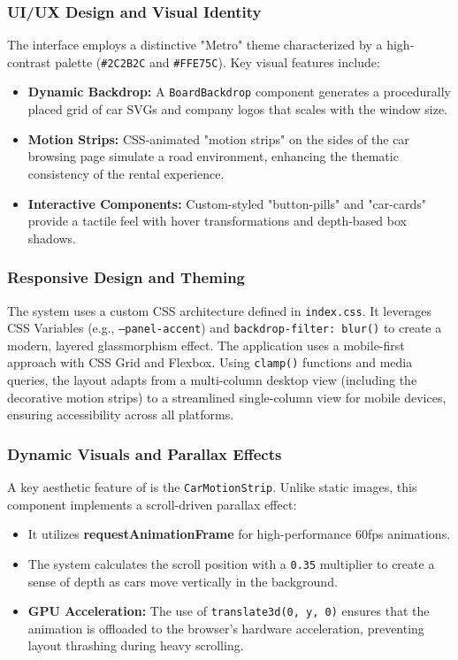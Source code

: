 \subsubsection{UI/UX Design and Visual Identity}
The interface employs a distinctive "Metro" theme characterized by a high-contrast palette (\texttt{\#2C2B2C} and \texttt{\#FFE75C}). Key visual features include:
\begin{itemize}
    \item \textbf{Dynamic Backdrop:} A \texttt{BoardBackdrop} component generates a procedurally placed grid of car SVGs and company logos that scales with the window size.
    \item \textbf{Motion Strips:} CSS-animated "motion strips" on the sides of the car browsing page simulate a road environment, enhancing the thematic consistency of the rental experience.
    \item \textbf{Interactive Components:} Custom-styled "button-pills" and "car-cards" provide a tactile feel with hover transformations and depth-based box shadows.
\end{itemize}


\subsubsection{Responsive Design and Theming}
The system uses a custom CSS architecture defined in \texttt{index.css}. 
It leverages CSS Variables (e.g., \texttt{--panel-accent}) and \texttt{backdrop-filter: blur()} to create a modern, layered glassmorphism effect. 
The application uses a mobile-first approach with CSS Grid and Flexbox. Using \texttt{clamp()} functions and media queries, 
the layout adapts from a multi-column desktop view (including the decorative motion strips) to a streamlined single-column view for mobile devices, 
ensuring accessibility across all platforms.


\subsubsection{Dynamic Visuals and Parallax Effects}
A key aesthetic feature of \projectTitle{} is the \texttt{CarMotionStrip}. Unlike static images, this component implements a scroll-driven parallax effect:
\begin{itemize}
    \item It utilizes \textbf{requestAnimationFrame} for high-performance 60fps animations.
    \item The system calculates the scroll position with a \texttt{0.35} multiplier to create a sense of depth as cars move vertically in the background.
    \item \textbf{GPU Acceleration:} The use of \texttt{translate3d(0, y, 0)} ensures that the animation is offloaded to the browser's hardware acceleration, preventing layout thrashing during heavy scrolling.
\end{itemize}

